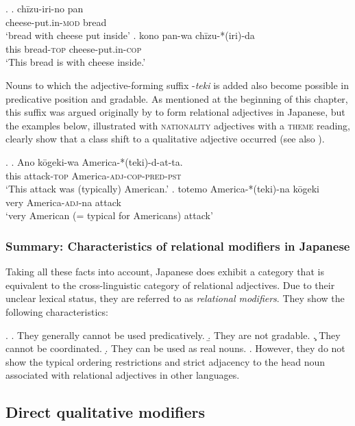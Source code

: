 \ex. \ag. chīzu-iri-no pan\\
cheese-put.in-\textsc{mod} bread\\
`bread with cheese put inside'
\bg. kono pan-wa chīzu-*(iri)-da\\
this bread-\textsc{top} cheese-put.in-\textsc{cop} \\
`This bread is with cheese inside.’

Nouns to which the adjective-forming suffix -\textit{teki} is added also become possible in predicative position and gradable. As mentioned at the beginning of this chapter, this suffix was argued originally by \citet{bisetto:2010:RA} to form relational adjectives in Japanese, but the examples below, illustrated with \textsc{nationality} adjectives with a \textsc{theme} reading, clearly show that a class shift to a qualitative adjective occurred (see also \citealt[48]{nagano:2016:are}).

\ex. \label{like} \ag. Ano kōgeki-wa America-*(teki)-d-at-ta.\\
this attack-\textsc{top} America-\textsc{adj}-\textsc{cop-pred-pst}\\
`This attack was (typically) American.'
\bg. totemo America-*(teki)-na kōgeki\\
very America-\textsc{adj}-na attack\\
`very American (= typical for Americans) attack'

\subsubsection{Summary: Characteristics of relational modifiers in Japanese}

Taking all these facts into account, Japanese does exhibit a category that is equivalent to the cross-linguistic category of relational adjectives. Due to their unclear lexical status, they are referred to as \textit{relational modifiers}. They show the following characteristics:

\ex. \a. They generally cannot be used predicatively.
\b. They are not gradable.
\c. They cannot be coordinated.
\d. They can be used as real nouns.
\e. However, they do not show the typical ordering restrictions and strict adjacency to the head noun associated with relational adjectives in other languages.

\subsection{Direct qualitative modifiers} \label{QM}

